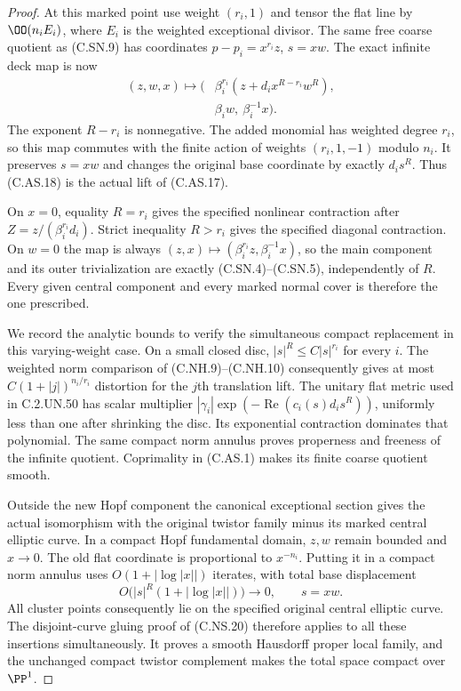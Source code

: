 \begin{proof}
At this marked point use weight
$(r_i,1)$ and tensor the flat line
by $\OO(n_iE_i)$, where $E_i$ is
the weighted exceptional divisor.
The same free coarse quotient as
(C.SN.9) has coordinates
$p-p_i=x^{r_i}z$, $s=xw$.
The exact infinite deck map is now
\[
 \begin{split}
 (z,w,x)\longmapsto\bigl(&
   \beta_i^{r_i}(z+d_i x^{R-r_i}w^R),\\
   &\beta_iw,\ \beta_i^{-1}x\bigr).
 \end{split}                                             \tag{C.AS.18}
\]
The exponent $R-r_i$ is nonnegative.
The added monomial has weighted degree
$r_i$, so this map commutes with the
finite action of weights
$(r_i,1,-1)$ modulo $n_i$. It preserves
$s=xw$ and changes the original base
coordinate by exactly $d_i s^R$.
Thus (C.AS.18) is the actual lift
of (C.AS.17).

On $x=0$, equality $R=r_i$ gives the
specified nonlinear contraction after
$Z=z/(\beta_i^{r_i}d_i)$. Strict
inequality $R>r_i$ gives the specified
diagonal contraction. On $w=0$ the
map is always
$(z,x)\mapsto(\beta_i^{r_i}z,\beta_i^{-1}x)$,
so the main component and its outer
trivialization are exactly
(C.SN.4)--(C.SN.5), independently of
$R$. Every given central component
and every marked normal cover is
therefore the one prescribed.

We record the analytic bounds to
verify the simultaneous compact
replacement in this varying-weight
case. On a small closed disc,
$|s|^R\le C|s|^{r_i}$ for every $i$.
The weighted norm comparison of
(C.NH.9)--(C.NH.10) consequently
gives at most
$C(1+|j|)^{n_i/r_i}$ distortion
for the $j$th translation lift.
The unitary flat metric used in
C.2.UN.50 has scalar multiplier
$|\gamma_i|\exp(-\operatorname{Re}(c_i(s)d_i s^R))$,
uniformly less than one after
shrinking the disc. Its exponential
contraction dominates that polynomial.
The same compact norm annulus proves
properness and freeness of the
infinite quotient. Coprimality in
(C.AS.1) makes its finite coarse
quotient smooth.

Outside the new Hopf component the
canonical exceptional section gives
the actual isomorphism with the
original twistor family minus its
marked central elliptic curve.
In a compact Hopf fundamental domain,
$z,w$ remain bounded and $x\to0$.
The old flat coordinate is proportional
to $x^{-n_i}$. Putting it in a compact
norm annulus uses
$O(1+|\log|x||)$ iterates, with total
base displacement
\[
                   O\bigl(|s|^R(1+|\log|x||)\bigr)
                          \longrightarrow0,
                         \qquad s=xw.                   \tag{C.AS.19}
\]
All cluster points consequently lie
on the specified original central
elliptic curve. The disjoint-curve
gluing proof of (C.NS.20) therefore
applies to all these insertions
simultaneously. It proves a smooth
Hausdorff proper local family, and
the unchanged compact twistor
complement makes the total space
compact over $\PP^1$.


\end{proof}
